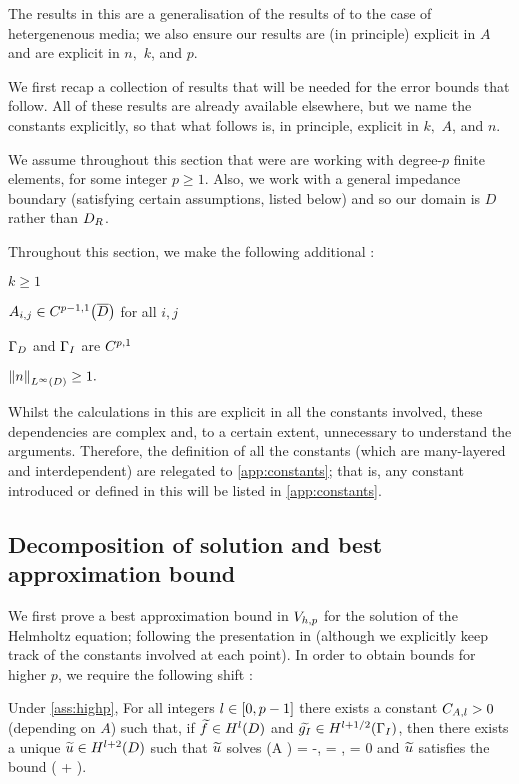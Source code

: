 The results in this  are a generalisation of the results of \cite{DuWu:15} to the case of hetergenenous media; we also ensure our results are (in principle) explicit in $A$ and are explicit in $n,$ $k$, and $p.$

We first recap a collection of results that will be needed for the error bounds that follow. All of these results are already available elsewhere, but we name the constants explicitly, so that what follows is, in principle, explicit in $k,$ $A$, and $n.$

We assume throughout this section that were are working with degree-$p$ finite elements, for some integer $p \geq 1.$ Also, we work with a general impedance boundary (satisfying certain assumptions, listed below) and so our domain is $D$ rather than $D_{R}$.

Throughout this section, we make the following additional :
\label{ass:highp}
\bit
\item $k \geq 1$
\item $\Aij \in \CpmooDclos$ for all $i,j$
\item $\Gamma_{D}$ and $\Gamma_{I}$ are $C^{p,1}$
\item $\NLiD{n} \geq 1.$
  \eit
\eas

Whilst the calculations in this  are explicit in all the constants involved, these dependencies are complex and, to a certain extent, unnecessary to understand the arguments. Therefore, the definition of all the constants (which are many-layered and interdependent) are relegated to \cref{app:constants}; that is, any constant introduced or defined in this  will be listed in \cref{app:constants}.

\subsection{Decomposition of solution and best approximation bound}

We first prove a best approximation bound in $V_{h,p}$ for the solution of the Helmholtz equation; following the presentation in \cite{ChNi:18a} (although we explicitly keep track of the constants involved at each point). In order to obtain bounds for higher $p$, we require the following shift :

\label{thm:shift}
Under \cref{ass:highp}, For all integers $l \in \mleft[0,p-1\mright]$ there exists a constant $C_{A,l}>0$ (depending on $A$) such that, if $\ftilde \in \HlD$ and $\gItilde \in \HlphGI$, then there exists a unique $\utilde \in \HlptD$ such that $\widetilde{u}$ solves
\beqs
\grad \cdot \mleft(A \grad \utilde\mright) = -\ftilde,
\eeqs
\beqs
\dn \utilde = \gItilde, \tand
\eeqs
\beqs
\trD \utilde = 0
\eeqs
and $\widetilde{u}$ satisfies the bound
\beq\label{eq:shift}
\NHlptD{\utilde} \leq \CAl \mleft(\NHlD{\ftilde} + \NHlphGI{\gItilde}\mright).
\eeq
\enth

